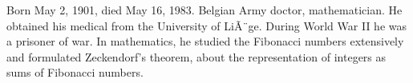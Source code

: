 \documentclass[12pt]{article}
\begin{document}
Born May 2, 1901, died May 16, 1983. Belgian Army doctor, mathematician. He obtained his medical  from the University of LiÃ¨ge. During World War II he was a prisoner of war. In mathematics, he studied the Fibonacci numbers extensively and formulated Zeckendorf's theorem, about the representation of integers as sums of Fibonacci numbers.
\end{document}
